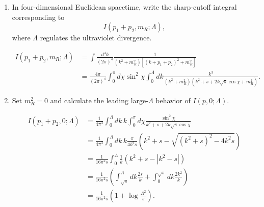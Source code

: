 \begin{enumerate}[label=\alph*)]
    \item In four-dimensional Euclidean spacetime, write the sharp-cutoff
    integral corresponding to
    \begin{equation}
        I(p_1+p_2,m_R;\Lambda),
    \end{equation}
    where $\Lambda$ regulates the ultraviolet divergence.
    \begin{solution}
        \begin{equation}
        \begin{aligned}
            I(p_1+p_2,m_R;\Lambda) &=
        \int \frac{d^4k}{(2\pi)^4}\frac{1}{(k^2+m_R^2)[(k+p_1+p_2)^2+m_R^2]}\\
        &=\frac{4\pi}{(2\pi)^4}\int_0^\pi d\chi\sin^2 \chi\int^\Lambda_0dk \frac{k^3}{(k^2+m_R^2)(k^2+ s + 2k\sqrt{s}\cos\chi +m_R^2)}.
        \end{aligned}
        \end{equation}
    \end{solution}

    \item Set $m_R^2=0$ and calculate the leading large-$\Lambda$ behavior of
    $I(p,0;\Lambda)$.
    \begin{solution}
        \begin{equation}
            \begin{aligned}
                I(p_1+p_2,0;\Lambda) &= \frac{1}{4\pi^3}\int_0^\Lambda dk\, k \int_{0}^\pi d\chi\frac{\sin^2\chi}{k^2 +s +2k\sqrt{s}\cos\chi}\\
                &= \frac{1}{4\pi^3}\int_0^\Lambda dk\, k \frac{\pi}{4k^2s}\left(k^2 +s - \sqrt{(k^2+s)^2 -4k^2s}\right)\\
                &=\frac{1}{16\pi^2s}\int ^\Lambda_0\frac{1}{k}(k^2+s - |k^2-s|)\\
                &=\frac{1}{16\pi^2s}\left(\int^\Lambda_{\sqrt{s}}dk \frac{2s}{k} + \int_0^{\sqrt{s}}dk \frac{2k^2}{k}\right)\\
                &=\frac{1}{16\pi^2s}\left(1 + \log\frac{\Lambda^2}{s}\right).
            \end{aligned}
        \end{equation}
    \end{solution}


\end{enumerate}
